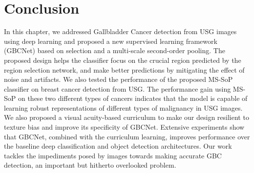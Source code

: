 \section{Conclusion}
In this chapter, we addressed Gallbladder Cancer detection from USG images using deep learning and proposed a new supervised learning framework (GBCNet) based on \roi selection and a multi-scale second-order pooling. The proposed design helps the classifier focus on the crucial \gb region predicted by the region selection network, and make better predictions by mitigating the effect of noise and artifacts. We also tested the performance of the proposed MS-SoP classifier on breast cancer detection from USG. The performance gain using MS-SoP on these two different types of cancers indicates that the model is capable of learning robust representations of different types of malignancy in USG images. We also proposed a visual acuity-based curriculum to make our design resilient to texture bias and improve its specificity of GBCNet. Extensive experiments show that GBCNet, combined with the curriculum learning, improves performance over the baseline deep classification and object detection architectures. Our work tackles the impediments posed by \usg images towards making accurate GBC detection, an important but hitherto overlooked problem.

